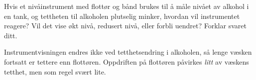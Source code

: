 

Hvis et nivåinstrument med flottør og bånd brukes til å måle nivået av alkohol i en tank, og tettheten til alkoholen plutselig minker, hvordan vil instrumentet reagere? Vil det vise økt nivå, redusert nivå, eller forbli uendret? Forklar svaret ditt.







Instrumentvisningen endres ikke ved tetthetsendring i alkoholen, så lenge væsken fortsatt er tettere enn flottøren. Oppdriften på flottøren påvirkes {\it litt} av væskens tetthet, men som regel svært lite.









